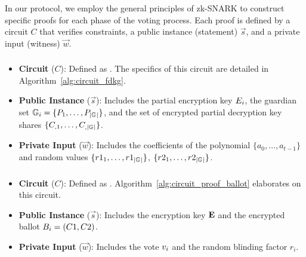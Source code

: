 \documentclass[runningheads]{llncs}
\begin{document}
In our protocol, we employ the general principles of zk-SNARK to construct specific proofs for each phase of the voting process. Each proof is defined by a circuit $C$ that verifies constraints, a public instance (statement) $\vec{s}$, and a private input (witness) $\vec{w}$.

\subsubsection{}\label{sec:proof-fdkg}

\begin{itemize}
    \item \textbf{Circuit} ($C$): Defined as \ProofFDKGInformal{}. The specifics of this circuit are detailed in Algorithm~\ref{alg:circuit_fdkg}.
    \item \textbf{Public Instance} ($\vec{s}$): Includes the partial encryption key $E_{i}$, the guardian set $\mathbb{G}_{i} = \{P_{1},\dots,P_{|\mathbb{G}_{}|}\}$, and the set of encrypted partial decryption key shares $\{C_{,1},\dots, C_{,|\mathbb{G}_{}|}\}$.
    \item \textbf{Private Input} ($\vec{w}$): Includes the coefficients of the polynomial $\{a_0, \dots, a_{t-1}\}$ and random values $\{r1_1,\dots,r1_{|\mathbb{G}_{}|}\}$, $\{r2_1,\dots,r2_{|\mathbb{G}_{}|}\}$.
\end{itemize}

\subsubsection{}\label{sec:proof-ballot}

\begin{itemize}
    \item \textbf{Circuit} ($C$): Defined as \ProofBALLOTInformal{}. Algorithm~\ref{alg:circuit_proof_ballot} elaborates on this circuit.
    \item \textbf{Public Instance} ($\vec{s}$): Includes the encryption key $\textbf{E}{}$ and the encrypted ballot $B_{i} = (C1, C2)$.
    \item \textbf{Private Input} ($\vec{w}$): Includes the vote $v_{i}$ and the random blinding factor $r_i$.
\end{itemize}

\subsubsection{}\label{sec:proof-pd}
\end{document}
